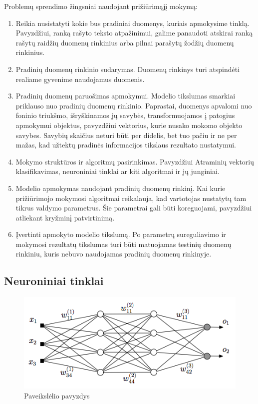 \documentclass{VUMIFInfBakalaurinis}
\begin{document}
Problemų sprendimo žingsniai naudojant prižiūrimąjį mokymą:
\begin{enumerate}
  \item Reikia nusistatyti kokie bus pradiniai duomenys, kuriais apmokysime tinklą. Pavyzdžiui, ranką rašyto teksto atpažinimui, galime panaudoti atskirai ranką rašytų raidžių duomenų rinkinius arba pilnai parašytų žodžių duomenų rinkinius.
  \item Pradinių duomenų rinkinio sudarymas. Duomenų rinkinys turi atspindėti realiame gyvenime naudojamus duomenis.
  \item Pradinių duomenų paruošimas apmokymui. Modelio tikslumas smarkiai priklauso nuo pradinių duomenų rinkinio. Paprastai, duomenys apvalomi nuo foninio triukšmo, išryškinamos jų savybės, transformuojamos į patogius apmokymui objektus, pavyzdžiui vektorius, kurie nusako mokomo objekto savybes. Savybių skaičius neturi būti per didelis, bet tuo pačiu ir ne per mažas, kad užtektų pradinės informacijos tikslaus rezultato nustatymui.
  \item Mokymo struktūros ir algoritmų pasirinkimas. Pavyzdžiui Atraminių vektorių klasifikavimas, neuroniniai tinklai ar kiti algoritmai ir jų junginiai.
  \item Modelio apmokymas naudojant pradinių duomenų rinkinį. Kai kurie prižiūrimojo mokymosi algoritmai reikalauja, kad vartotojas nustatytų tam tikrus valdymo parametrus. Šie parametrai gali būti koreguojami, pavyzdžiui atliekant kryžminį patvirtinimą.
  \item Įvertinti apmokyto modelio tikslumą. Po parametrų sureguliavimo ir mokymosi rezultatų tikslumas turi būti matuojamas testinių duomenų rinkiniu, kuris nebuvo naudojamas pradinių duomenų rinkinyje.
\end{enumerate}

\subsection{Neuroniniai tinklai}
\begin{figure}[H]
    \centering
    \includegraphics[scale=0.5]{img/MLP}
    \caption{Paveikslėlio pavyzdys}
    \label{img:mlp}
\end{figure}
\end{document}
